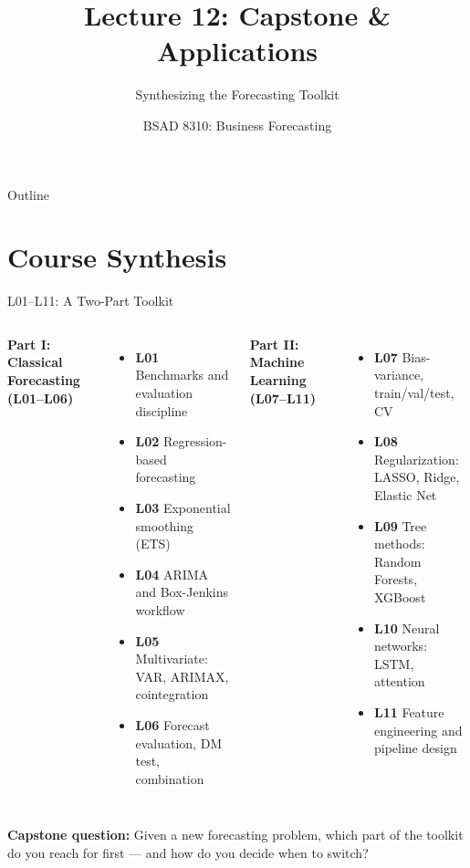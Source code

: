 \documentclass[aspectratio=169, 10pt]{beamer}
\title{Lecture 12: Capstone \& Applications}
\subtitle{Synthesizing the Forecasting Toolkit}
\author{BSAD 8310: Business Forecasting}
\institute{University of Nebraska at Omaha}
\begin{document}
\begin{frame}
  \titlepage
\end{frame}

\begin{frame}{Outline}
  \tableofcontents
\end{frame}

\section{Course Synthesis}


\begin{frame}{L01--L11: A Two-Part Toolkit}
  \begin{columns}[T]
      \textbf{Part I: Classical Forecasting (L01--L06)}
      \begin{itemize}\small
        \item \textbf{L01} Benchmarks and evaluation discipline
        \item \textbf{L02} Regression-based forecasting
        \item \textbf{L03} Exponential smoothing (ETS)
        \item \textbf{L04} ARIMA and Box-Jenkins workflow
        \item \textbf{L05} Multivariate: VAR, ARIMAX, cointegration
        \item \textbf{L06} Forecast evaluation, DM test, combination
      \end{itemize}
      \textbf{Part II: Machine Learning (L07--L11)}
      \begin{itemize}\small
        \item \textbf{L07} Bias-variance, train/val/test, CV
        \item \textbf{L08} Regularization: LASSO, Ridge, Elastic Net
        \item \textbf{L09} Tree methods: Random Forests, XGBoost
        \item \textbf{L10} Neural networks: LSTM, attention
        \item \textbf{L11} Feature engineering and pipeline design
      \end{itemize}
  \end{columns}
  \vspace{0.2cm}
  \begin{keybox}
    {\small \textbf{Capstone question:} Given a new forecasting problem,
    which part of the toolkit do you reach for first --- and how do you
    decide when to switch?}
  \end{keybox}
\end{frame}
\end{document}
